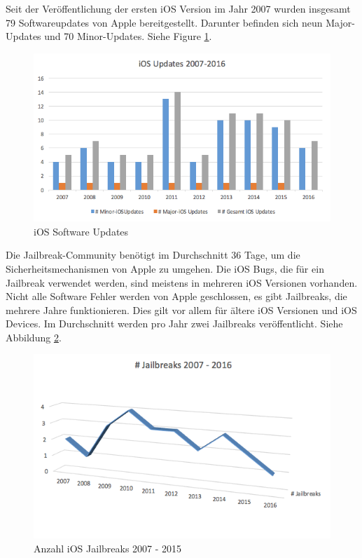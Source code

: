 Seit der Veröffentlichung der ersten iOS Version im Jahr 2007 wurden insgesamt 79 Softwareupdates von Apple bereitgestellt. Darunter befinden sich neun Major-Updates und 70  Minor-Updates. Siehe Figure \ref{fig:iOS Software Updates}.

\begin{figure}[ht!]
        \centering
                \includegraphics[scale=0.7]{Bilder/iOSUpdates1}
        \caption{iOS Software Updates\cite{Apple[7]}}
        	\label{fig:iOS Software Updates}
\end{figure}

Die Jailbreak-Community benötigt im Durchschnitt 36 Tage, um die Sicherheitsmechanismen von Apple zu umgehen. Die iOS Bugs, die für ein Jailbreak verwendet werden, sind meistens in mehreren iOS Versionen vorhanden. Nicht alle Software Fehler werden von Apple geschlossen, es gibt Jailbreaks, die mehrere Jahre funktionieren. Dies gilt vor allem für ältere iOS Versionen und iOS Devices. Im Durchschnitt werden pro Jahr zwei Jailbreaks veröffentlicht. Siehe Abbildung \ref{fig:iOS Jailbreak}.

\begin{figure}[ht!  ]
        \centering
                \includegraphics[scale=0.7]{Bilder/AnzahlJB}
        \caption{Anzahl iOS Jailbreaks 2007 - 2015}
        	\label{fig:iOS Jailbreak}
\end{figure}


